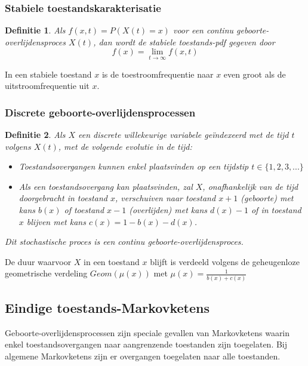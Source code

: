 \documentclass{article}
\newtheorem{mydef}{Definitie}
\begin{document}
	\subsubsection{Stabiele toestandskarakterisatie}
	
	\begin{mydef}
		Als $f(x, t) = P(X(t) = x)$ voor een continu geboorte-overlijdensproces $X(t)$, dan wordt de stabiele toestands-pdf gegeven door
		$$
			f(x) = \lim_{t \rightarrow \infty}f(x,t)
		$$

	\end{mydef}
	
		In een stabiele toestand $x$ is de toestroomfrequentie naar $x$ even groot als de uitstroomfrequentie uit $x$.
	
	
	\subsubsection{Discrete geboorte-overlijdensprocessen}
	
	\begin{mydef}
		Als $X$ een discrete willekeurige variabele geïndexeerd met de tijd $t$ volgens $X(t)$, met de volgende evolutie in de tijd:
		\begin{itemize}
			\item Toestandsovergangen kunnen enkel plaatsvinden op een tijdstip $t \in \{1, 2, 3, ...\}$			
			\item Als een toestandsovergang kan plaatsvinden, zal $X$, onafhankelijk van de tijd doorgebracht in toestand $x$, verschuiven naar toestand $x+1$ (geboorte) met kans $b(x)$ of toestand $x-1$ (overlijden) met kans $d(x)-1$ of in toestand $x$ blijven met kans $c(x) = 1-b(x)-d(x)$.
		\end{itemize}
		Dit stochastische proces is een continu geboorte-overlijdensproces.
	\end{mydef}


	De duur waarvoor $X$ in een toestand $x$ blijft is verdeeld volgens de geheugenloze geometrische verdeling $Geom(\mu(x))$ met $\mu(x) = \frac{1}{b(x) + c(x)}$
	
	\subsection{Eindige toestands-Markovketens}
	
	Geboorte-overlijdensprocessen zijn speciale gevallen van Markovketens waarin enkel toestandsovergangen naar aangrenzende toestanden zijn toegelaten. Bij algemene Markovketens zijn er overgangen toegelaten naar alle toestanden.
	
\end{document}
